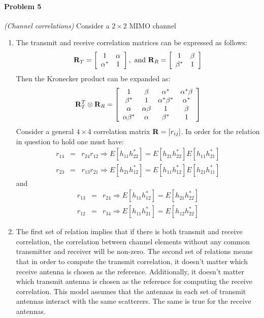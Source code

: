 \documentclass[12pt]{article}
\begin{document}
\begin{enumerate}
\paragraph{Problem 5} {\it (Channel correlations) } \quad
Consider a $2\times 2$ MIMO channel
\begin{enumerate}
\item The transmit and receive correlation matrices can be
expressed as follows:
\[
{\bf R}_T=\left[
\begin{array}{cc}
1 & \alpha\\
\alpha^* & 1
\end{array}
\right],\mbox{ and } {\bf R}_R = \left[\begin{array}{cc}
1 & \beta\\
\beta^* & 1
\end{array}
\right]
\]
Then the Kronecker product can be expanded as:
\[
{\bf R}_T^T \otimes {\bf R}_R=\left[
\begin{array}{cccc}
1 & \beta & \alpha^* & \alpha^*\beta\\
\beta^* & 1 & \alpha^*\beta^* & \alpha^*\\
\alpha & \alpha\beta & 1 & \beta\\
\alpha\beta^* & \alpha & \beta^* & 1\\
\end{array}
\right]
\]
Consider a general $4\times 4$ correlation matrix ${\bf
R}=[r_{ij}]$. In order for the relation in question to hold one
must have:
\begin{eqnarray}
r_{14}&=&r_{24}r_{12}\Rightarrow
E[h_{11}h^*_{22}]=E[h_{21}h^*_{22}]E[h_{11}h^*_{21}]\\
r_{23}&=&r_{13}r_{21}\Rightarrow
E[h_{21}h^*_{12}]=E[h_{11}h^*_{12}]E[h_{21}h^*_{11}]
\end{eqnarray}
and
\begin{eqnarray}
r_{13}&=&r_{24}\Rightarrow E[h_{11}h^*_{12}]=E[h_{21}h^*_{22}]\\
r_{12}&=&r_{34}\Rightarrow E[h_{11}h^*_{21}]=E[h_{12}h^*_{22}]
\end{eqnarray}
\item The first set of relation implies that if there is both
transmit and receive correlation, the correlation between channel
elements without any common transmitter and receiver will be
non-zero.  The second set of relations means that in order to
compute the transmit correlation, it doesn't matter which receive
antenna is chosen as the reference.  Additionally, it doesn't matter which transmit antenna is chosen as the reference for computing the receive correlation.  This model assumes that the antennas in each set of transmit antennas interact with the same scatterers.  The same is true for the receive antennas.
\end{enumerate}

\end{enumerate}
\end{document}
